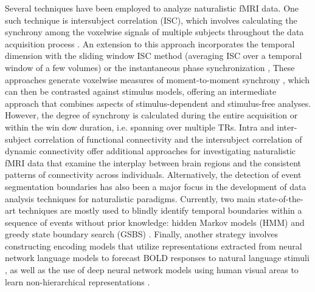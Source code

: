 Several techniques have been employed to analyze naturalistic fMRI data. One
such technique is intersubject correlation (ISC), which involves calculating the
synchrony among the voxelwise signals of multiple subjects throughout the data
acquisition process
\citep{Hasson2004IntersubjectSynchronizationCortical,Wilson2007SuperiorTemporalCortex,Nastase2019Measuringsharedresponses,Jangraw2023Intersubjectcorrelation,Chen2020Untanglingrelatednesscorrelations}.
An extension to this approach incorporates the temporal dimension with the
sliding window ISC method (averaging ISC over a temporal window of a few
volumes) or the instantaneous phase synchronization
\citep{Glerean2012FunctionalMagneticResonance}, These approaches generate
voxelwise measures of moment-to-moment synchrony
\citep{Nummenmaa2012Emotionspromotesocial}, which can then be contrasted against
stimulus models, offering an intermediate approach that combines aspects of
stimulus-dependent and stimulus-free analyses. However, the degree of synchrony
is calculated during the entire acquisition or within the win dow duration, i.e.
spanning over multiple TRs. Intra and inter-subject correlation of functional
connectivity \citep{Vanderwal2017Individualdifferencesfunctional} and the
intersubject correlation of dynamic connectivity
\citep{Di2020Intersubjectconsistentdynamic} offer additional approaches for
investigating naturalistic fMRI data that examine the interplay between brain
regions and the consistent patterns of connectivity across individuals.
Alternatively, the detection of event segmentation boundaries has also been a
major focus in the development of data analysis techniques for naturalistic
paradigms. Currently, two main state-of-the-art techniques are mostly used to
blindly identify temporal boundaries within a sequence of events without prior
knowledge: hidden Markov models (HMM)
\citep{Baldassano2017DiscoveringEventStructure} and greedy state boundary search
(GSBS) \citep{Geerligs2021Detectingneuralstate}. Finally, another strategy
involves constructing encoding models that utilize representations extracted
from neural network language models to forecast BOLD responses to natural
language stimuli \citep{Jain2020Interpretablemultitimescale}, as well as the use
of deep neural network models using human visual areas to learn non-hierarchical
representations \citep{StYves2023Brainoptimizeddeep}.


